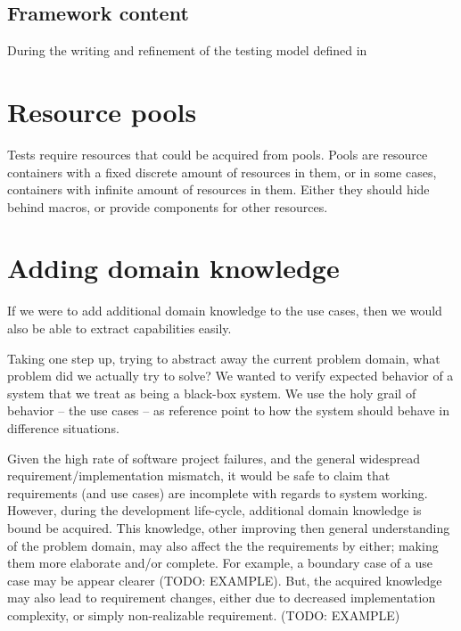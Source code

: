 \subsection{Framework content}

During the writing and refinement of the testing model defined in 

\section{Resource pools}
Tests require resources that could be acquired from pools. Pools are resource containers with a fixed discrete amount of resources in them, or in some cases, containers with infinite amount of resources in them. Either they should hide behind macros, or provide components for other resources.

\section{Adding domain knowledge}
If we were to add additional domain knowledge to the use cases, then we would also be able to extract capabilities easily.

Taking one step up, trying to abstract away the current problem domain, what problem did we actually try to solve? We wanted to verify expected behavior of a system that we treat as being a black-box system. We use the holy grail of behavior -- the use cases -- as reference point to how the system should behave in difference situations.


Given the high rate of software project failures, and the general widespread requirement/implementation mismatch, it would be safe to claim that requirements (and use cases) are incomplete with regards to system working. However, during the development life-cycle, additional domain knowledge is bound be acquired. This knowledge, other improving then general understanding of the problem domain, may also affect the the requirements by either; making them more elaborate and/or complete. For example, a boundary case of a use case may be appear clearer (TODO: EXAMPLE). But, the acquired knowledge may also lead to requirement changes, either due to decreased implementation complexity, or simply non-realizable requirement. (TODO: EXAMPLE)

